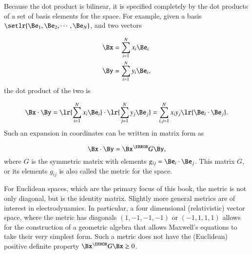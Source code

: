 %
%

Because the dot product is bilinear, it is
specified completely by the dot products of a set of basis elements for the space.
For example,
given a basis \( \setlr{ \Be_1, \Be_2, \cdots, \Be_N} \), and two vectors

\begin{dmath}\label{eqn:prereq_standardbasis:240}
\begin{aligned}
   \Bx &= \sum_{i = 1}^N x_i \Be_i \\
   \By &= \sum_{i = 1}^N y_i \Be_i,
\end{aligned}
\end{dmath}
the dot product of the two is

\begin{dmath}\label{eqn:prereq_standardbasis:260}
\Bx \cdot \By
=
   \lr{ \sum_{i = 1}^N x_i \Be_i } \cdot
   \lr{ \sum_{j = 1}^N y_j \Be_j }
=
   \sum_{i,j = 1}^N x_i y_j \lr{ \Be_i \cdot \Be_j }.
\end{dmath}
Such an expansion in coordinates can be written in matrix form as

\begin{dmath}\label{eqn:prereq_standardbasis:280}
\Bx \cdot \By
=
\Bx^\T G \By,
\end{dmath}
where \( G \) is the symmetric matrix with elements \( g_{ij} = \Be_i \cdot \Be_j \).
This matrix \( G \), or its elements \( g_{ij} \) is also called the metric for the space.

For Euclidean spaces, which are the primary focus of this book, the metric is not only diagonal, but is the identity matrix.
Slightly more general metrics are of interest in electrodynamics.  In particular, a four dimensional (relativistic) vector space, where the metric has diagonals \( (1,-1,-1,-1) \) or \( (-1, 1,1,1) \) allows for the construction of a geometric algebra that allows Maxwell's equations to take their very simplest form.  Such a metric does not have the (Euclidean) positive definite property \( \Bx^\T G \Bx \ge 0 \).

